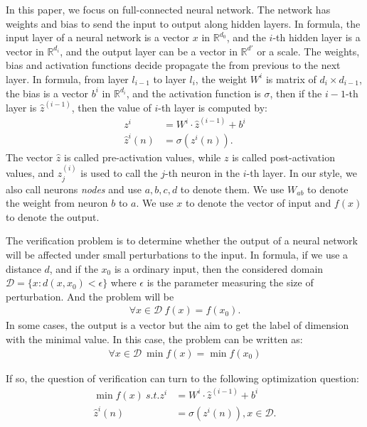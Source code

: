 \documentclass[8pt]{article}
\theoremstyle{definition}
\begin{document}
In this paper, we focus on full-connected neural network. The network has weights and bias to send the input to output along hidden layers. In formula, the input layer of a neural network is a vector $x$ in $\mathbb{R}^{d_0}$, and the $i$-th hidden layer  is a vector in $\mathbb{R}^{d_i}$, and the output layer can be a vector in $\mathbb{R}^{d'}$ or a scale. The weights, bias and activation functions decide propagate the from previous to the next layer. In formula, from layer $l_{i-1}$ to layer $l_{i}$, the weight $W^i$ is matrix of $d_i\times d_{i-1}$, the bias is a vector $b^i$ in $\mathbb{R}^{d_i}$, and the activation function is $\sigma$, then  if the $i-1$-th layer is $\hat{z}^{(i-1)}$, then the value of $i$-th layer is computed by: \begin{align*}
	{z}^{i} &= W^i\cdot \hat{z}^{(i-1)}+ b^i\\
	\hat{z}^{i}(n) &= \sigma({z}^i(n)).
\end{align*} The vector $\hat{z}$ is called pre-activation values, while $z$ is called post-activation values, and $z^{(i)}_j$ is used to call the $j$-th neuron in the $i$-th layer. In our style, we also call neurons \emph{nodes} and use $a,b,c,d$ to denote them. We use $W_{ab}$ to denote the weight from neuron $b$ to $a$. We use $x$ to denote the vector of input and  $f(x)$ to denote the output.


The verification problem is to determine whether the output of a neural network will be affected under small perturbations to the input. In formula, if we use a distance $d$, and if the $x_0$ is a ordinary input, then the considered domain $\mathcal{D}=\{x: d(x,x_0)<\epsilon\}$ where $\epsilon$ is the parameter measuring the size of perturbation. And the problem will be \begin{align*}
	\forall x\in\mathcal{D} \   f(x) = f(x_0).
\end{align*} In some cases, the output is a vector but the aim to get the label of dimension with the minimal value. In this case, the problem can be written as:\begin{align*}
\forall x \in\mathcal{D} \  \min f(x) = \min f(x_0)
\end{align*}

If so, the question of verification can turn to the following optimization question: \begin{align*}
	\min f(x) \ s.t. {z}^{i} &= W^i\cdot \hat{z}^{(i-1)}+ b^i\\
	\hat{z}^{i}(n) &= \sigma({z}^i(n)), x\in\mathcal{D}.
\end{align*}
\end{document}
